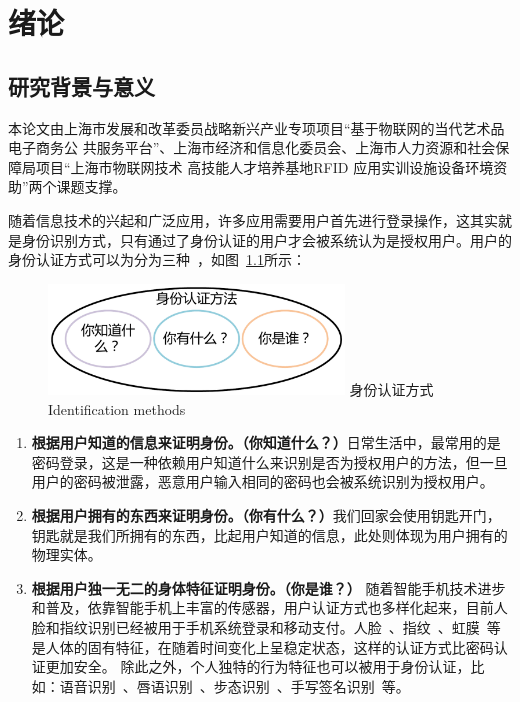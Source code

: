
\chapter{绪论}
\label{chap:intro}
\section{研究背景与意义}
本论文由上海市发展和改革委员战略新兴产业专项项目“基于物联网的当代艺术品电子商务公
共服务平台”、上海市经济和信息化委员会、上海市人力资源和社会保障局项目“上海市物联网技术
高技能人才培养基地RFID 应用实训设施设备环境资助”两个课题支撑。


随着信息技术的兴起和广泛应用，许多应用需要用户首先进行登录操作，这其实就是身份识别方式，只有通过了身份认证的用户才会被系统认为是授权用户。用户的身份认证方式可以为分为三种~\cite{Huang2011A}，如图~\ref{fig:identification-method}所示：
\begin{figure}[!htp]
  \centering
  \includegraphics[width=0.7\textwidth]{figure/identification-method.pdf}
  \bicaption
    {身份认证方式}
    {Identification methods}
  \label{fig:identification-method}
\end{figure}
\begin{enumerate}[label=(\arabic*),leftmargin=*]
    \item \textbf{根据用户知道的信息来证明身份。（你知道什么？）}日常生活中，最常用的是密码登录，这是一种依赖用户知道什么来识别是否为授权用户的方法，但一旦用户的密码被泄露，恶意用户输入相同的密码也会被系统识别为授权用户。
    \item \textbf{根据用户拥有的东西来证明身份。（你有什么？）}我们回家会使用钥匙开门，钥匙就是我们所拥有的东西，比起用户知道的信息，此处则体现为用户拥有的物理实体。
    \item \textbf{根据用户独一无二的身体特征证明身份。（你是谁？）} 随着智能手机技术进步和普及，依靠智能手机上丰富的传感器，用户认证方式也多样化起来，目前人脸和指纹识别已经被用于手机系统登录和移动支付。人脸~\cite{12717}、指纹~\cite{Andrew2005Handbook}、虹膜~\cite{Wildes1997Iris}等是人体的固有特征，在随着时间变化上呈稳定状态，这样的认证方式比密码认证更加安全。 除此之外，个人独特的行为特征也可以被用于身份认证，比如：语音识别~\cite{Rashid2008Security}、唇语识别~\cite{Cetingul2006Discriminative}、步态识别~\cite{Boulgouris2005Gait}、手写签名识别~\cite{Plamondona1989Automatic}等。 
\end{enumerate}

